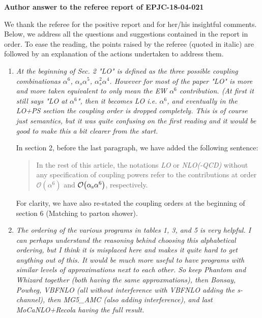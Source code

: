 \documentclass{report}
\begin{document}
\noindent

\begin{center}
  \LARGE \textbf{Author answer to the referee report of EPJC-18-04-021}
\end{center}
\vspace{0.5cm}
We thank the referee for the positive report and for her/his insightful comments. Below, we address all the questions and suggestions contained in the report in order. To ease the reading, the points raised by the referee (quoted in italic) are followed by an  explanation of the actions undertaken to address them. 

\vspace{0.5cm}
\begin{enumerate}

    \item \emph{At the beginning of Sec. 2 "LO" is defined as the three possible coupling
combinationas $\alpha^6$, $\alpha_s \alpha^5$, $\alpha_s^2 \alpha^4$. However for most of the paper "LO" is more 
and more taken equivalent to only mean the EW $\alpha^6$ contribution. (At first it still says "LO at $\alpha^6$", 
then it becomes
LO i.e. $\alpha^6$, and eventually in the LO+PS section the coupling order is dropped completely. 
This is of course just semantics, but it was quite confusing on the first reading and it would be good to make this a bit clearer from the start.}

In section 2, before the last paragraph, we have added the following sentence:
\begin{quote}
In the rest of this article, the notations \emph{LO} or \emph{NLO(-QCD)} without any specification of coupling powers refer to the contributions at order $\mathcal{O}{\left(\alpha^{6}\right)}$ and $\mathcal{O}{\left(\alpha_{\rm s}\alpha^{6}\right)}$, respectively.  
\end{quote}
For clarity, we have also re-stated the coupling orders at the beginning of section 6 (Matching to parton shower).

    \item \emph{The ordering of the various programs in tables 1, 3, and 5 is very helpful.
I can perhaps understand the reasoning behind choosing this alphabetical
ordering, but I think it is misplaced here and makes it quite hard to get
anything out of this. It would be much more useful to have programs with similar levels of approximations next to each other. So keep Phantom and Whizard together (both having the same approxmations), then Bonsay, Powheg, VBFNLO (all without interference with VBFNLO adding the s-channel), then MG5\_AMC (also adding interference), and last MoCaNLO+Recola having the full result.}


\end{enumerate}
\end{document}
